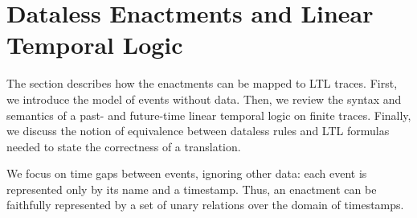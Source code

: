 \section{Dataless Enactments and Linear Temporal Logic}
\label{sec:dataless-model-ltl}
  
The section
describes how the enactments
can be mapped to LTL traces.
First, we introduce the model of events without data.
Then, we review the syntax and semantics of
a past- and future-time linear temporal logic
on finite traces.
Finally, we discuss the notion of equivalence
between dataless rules and LTL formulas
needed to state the correctness of a translation.
  
\smallskip
  
We focus on time gaps between events,
ignoring other data:
each event is represented only by its name and a timestamp.
Thus, an enactment can be faithfully represented
by a set of unary relations over the domain of timestamps.
  
